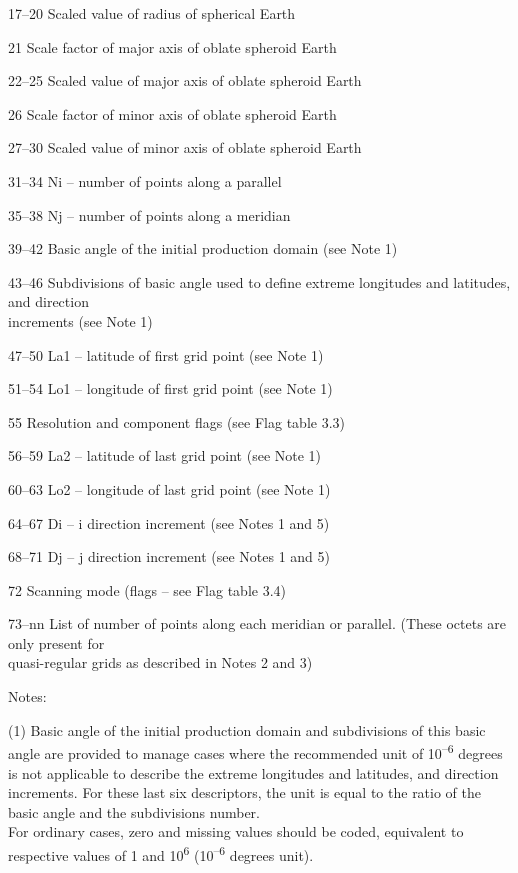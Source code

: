 17--20 Scaled value of radius of spherical Earth

21 Scale factor of major axis of oblate spheroid Earth

22--25 Scaled value of major axis of oblate spheroid Earth

26 Scale factor of minor axis of oblate spheroid Earth

27--30 Scaled value of minor axis of oblate spheroid Earth

31--34 Ni -- number of points along a parallel

35--38 Nj -- number of points along a meridian

39--42 Basic angle of the initial production domain (see Note 1)

43--46 Subdivisions of basic angle used to define extreme longitudes and latitudes, and direction\\
increments (see Note 1)

47--50 La1 -- latitude of first grid point (see Note 1)

51--54 Lo1 -- longitude of first grid point (see Note 1)

55 Resolution and component flags (see Flag table 3.3)

56--59 La2 -- latitude of last grid point (see Note 1)

60--63 Lo2 -- longitude of last grid point (see Note 1)

64--67 Di -- i direction increment (see Notes 1 and 5)

68--71 Dj -- j direction increment (see Notes 1 and 5)

72 Scanning mode (flags -- see Flag table 3.4)

73--nn List of number of points along each meridian or parallel. (These octets are only present for\\
quasi-regular grids as described in Notes 2 and 3)

Notes:

(1) Basic angle of the initial production domain and subdivisions of this basic angle are provided to manage cases where the recommended unit of 10\textsuperscript{--6} degrees is not applicable to describe the extreme longitudes and latitudes, and direction increments. For these last six descriptors, the unit is equal to the ratio of the basic angle and the subdivisions number.\\
For ordinary cases, zero and missing values should be coded, equivalent to respective values of 1 and 10\textsuperscript{6} (10\textsuperscript{--6} degrees unit).

